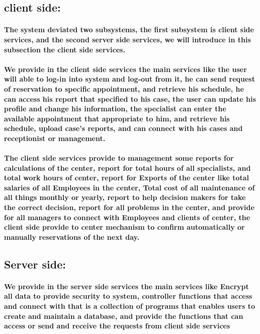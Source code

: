 \documentclass[../Psychological_system_web_application.tex]{subfiles}
\begin{document}
				\subsection{client side:}
					\paragraph{The system deviated two subsystems, the first subsystem is client side services, and the second server side services, we will introduce in this subsection the client side services.}
					\paragraph{We provide in the client side services the main services like the user will able to log-in into system and log-out from it, he can send request of reservation to specific appointment, and retrieve his schedule, he can access his report that specified to his case, the user can update his profile and change his information, the specialist can enter the available appointment that appropriate to him, and retrieve his schedule, upload case's reports, and can connect with his cases and receptionist or management.}
					\paragraph{The client side services provide to management some reports for calculations of the center, report for total hours of all specialists, and total work hours of center, report for Exports of the center like total salaries of all Employees in the center, Total cost of all maintenance of all things monthly or yearly, report to help decision makers for take the correct decision, report for all problems in the center, and provide for all managers to connect with Employees and clients of center, the client side provide to center mechanism to confirm automatically or manually reservations of the next day.}
					
				\subsection{Server side:}
					\paragraph{We provide in the server side services the main services like Encrypt all data to provide security to system, controller functions that access and connect with  that is a collection of programs that enables users to create and maintain a database, and provide the functions that can access or send and receive the requests from client side services}
\end{document}
